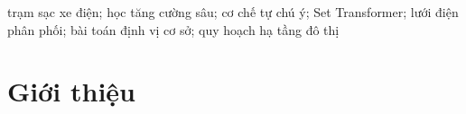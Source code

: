 \documentclass[10pt, conference, a4paper, compsocconf]{IEEEtran}
\begin{document}
\begin{IEEEkeywords}
trạm sạc xe điện; học tăng cường sâu; cơ chế tự chú ý; Set Transformer;
lưới điện phân phối; bài toán định vị cơ sở; quy hoạch hạ tầng đô thị
\end{IEEEkeywords}

\IEEEpeerreviewmaketitle

\section{Giới thiệu}
%
%
%
%
%
%
\end{document}
